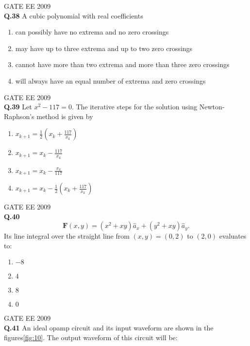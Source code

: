 \documentclass[12pt]{article}
\begin{document}
\vspace{0.5cm}
\hspace{10pt}
GATE EE 2009\\
\noindent\textbf{Q.38} A cubic polynomial with real coefficients

\begin{enumerate}
    \item can possibly have no extrema and no zero crossings
    \item may have up to three extrema and up to two zero crossings
    \item cannot have more than two extrema and more than three zero crossings
    \item will always have an equal number of extrema and zero crossings
\end{enumerate}

\vspace{0.5cm}
\hspace{10pt}
GATE EE 2009\\
\noindent\textbf{Q.39} Let \(x^{2} - 117 = 0\). The iterative steps for the solution using Newton-Raphson’s method is given by

\begin{enumerate}
    \item \(x_{k+1} = \frac{1}{2} \left(x_k + \frac{117}{x_k}\right)\)
    \item \(x_{k+1} = x_k - \frac{117}{x_k}\)
    \item \(x_{k+1} = x_k - \frac{x_k}{117}\)
    \item \(x_{k+1} = x_k - \frac{1}{2} \left(x_k + \frac{117}{x_k}\right)\)
\end{enumerate}

\vspace{0.5cm}
\hspace{10pt}
GATE EE 2009\\
\noindent\textbf{Q.40} 
\[
\mathbf{F}(x,y) = (x^{2} + xy) \hat{a}_x + (y^{2} + xy) \hat{a}_y.
\]
Its line integral over the straight line from \((x,y) = (0,2)\) to \((2,0)\) evaluates to:

\begin{enumerate}
    \item $-8$
    \item $4$
    \item $8$
    \item $0$
\end{enumerate}

\vspace{1cm}
\hspace{10pt}
GATE EE 2009\\
\noindent\textbf{Q.41} An ideal opamp circuit and its input waveform are shown in the figures\ref{fig:10}. The output waveform of this circuit will be:
\end{document}
